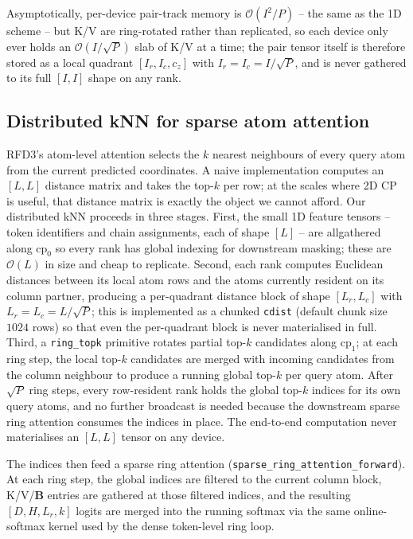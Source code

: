 \documentclass{article}
\theoremstyle{plain}
\theoremstyle{definition}
\theoremstyle{remark}
\begin{document}
Asymptotically, per-device pair-track memory is $\mathcal{O}(I^{2}/P)$ -- the same as the 1D scheme -- but K/V are ring-rotated rather than replicated, so each device only ever holds an $\mathcal{O}(I/\sqrt{P})$ slab of K/V at a time; the pair tensor itself is therefore stored as a local quadrant $[I_r, I_c, c_z]$ with $I_r=I_c=I/\sqrt{P}$, and is never gathered to its full $[I, I]$ shape on any rank.

\subsection{Distributed kNN for sparse atom attention}
\label{app:2d-knn}

RFD3's atom-level attention selects the $k$ nearest neighbours of every query atom from the current predicted coordinates. A naive implementation computes an $[L, L]$ distance matrix and takes the top-$k$ per row; at the scales where 2D CP is useful, that distance matrix is exactly the object we cannot afford. Our distributed kNN proceeds in three stages. First, the small 1D feature tensors -- token identifiers and chain assignments, each of shape $[L]$ -- are allgathered along $\text{cp}_0$ so every rank has global indexing for downstream masking; these are $\mathcal{O}(L)$ in size and cheap to replicate. Second, each rank computes Euclidean distances between its local atom rows and the atoms currently resident on its column partner, producing a per-quadrant distance block of shape $[L_r, L_c]$ with $L_r=L_c=L/\sqrt{P}$; this is implemented as a chunked \texttt{cdist} (default chunk size $1024$ rows) so that even the per-quadrant block is never materialised in full. Third, a \texttt{ring\_topk} primitive rotates partial top-$k$ candidates along $\text{cp}_1$; at each ring step, the local top-$k$ candidates are merged with incoming candidates from the column neighbour to produce a running global top-$k$ per query atom. After $\sqrt{P}$ ring steps, every row-resident rank holds the global top-$k$ indices for its own query atoms, and no further broadcast is needed because the downstream sparse ring attention consumes the indices in place. The end-to-end computation never materialises an $[L, L]$ tensor on any device.

The indices then feed a sparse ring attention (\texttt{sparse\_ring\_attention\_forward}). At each ring step, the global indices are filtered to the current column block, K/V/$\mathbf{B}$ entries are gathered at those filtered indices, and the resulting $[D, H, L_r, k]$ logits are merged into the running softmax via the same online-softmax kernel used by the dense token-level ring loop.
\end{document}
